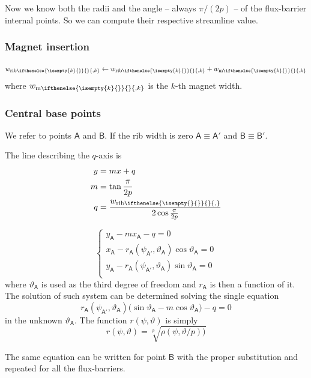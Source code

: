 \documentclass[b5paper,11pt,oneside,fleqn]{article}
\newcommand{\pt}[1]{\mathsf{#1}}
\newcommand{\te}{\vartheta}
\newcommand{\wm}[1][]{%
w_{\textup{m}
\ifthenelse{\isempty{#1}{}}{}{,#1}%
}}
\newcommand{\wrib}[1][]{%
w_{\textup{rib}
\ifthenelse{\isempty{#1}{}}{}{,#1}%
}}
\newcommand{\xth}[1]{$ #1 $-th}
\begin{document}
Now we know both the radii and the angle -- always $ \pi/(2p) $ -- of the
flux-barrier internal points. So we can compute their respective streamline
value.



\subsubsection{Magnet insertion}
\[
\wrib[k] \leftarrow \wrib[k] + \wm[k]
\]
where $ \wm[k] $ is the \xth{k} magnet width.


\subsubsection{Central base points}
We refer to points $ \pt{A} $ and $ \pt{B} $.
If the rib width is zero
$ \pt{A} \equiv \pt{A}' $ and
$ \pt{B} \equiv \pt{B}' $.

The line describing the $ q $-axis is
\begin{equation}
\begin{aligned}
y &= m x + q \\
m &= \tan\frac{\pi}{2p} \\
q &= \frac{\wrib}{2 \cos\frac{\pi}{2p}}
\end{aligned}
\end{equation}

\begin{equation}
\begin{cases}
y_\pt{A} - m x_\pt{A} - q = 0 \\
x_\pt{A} - r_\pt{A}(\psi_\pt{A'},\te_\pt{A}) \cos\te_\pt{A} = 0 \\
y_\pt{A} - r_\pt{A}(\psi_\pt{A'},\te_\pt{A}) \sin\te_\pt{A} = 0 \\
\end{cases}
\end{equation}
where $ \te_\pt{A} $ is used as the third degree of freedom and $ r_\pt{A} $ is
then a function of it.
The solution of such system can be determined solving the single equation
\begin{equation}
r_\pt{A}(\psi_\pt{A'},\te_\pt{A})
\bigl( \sin\te_\pt{A} - m \cos\te_\pt{A} \bigr) - q = 0
\end{equation}
in the unknown $ \te_\pt{A} $.
The function $ r(\psi,\te) $ is simply
\[
r(\psi,\te) = \sqrt[p]{ \rho(\psi,\te/p) \bigr) }
\]

The same equation can be written for point $ \pt{B} $ with the proper
substitution and repeated for all the flux-barriers.
\end{document}
